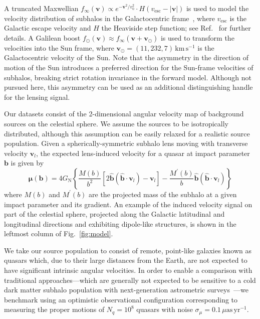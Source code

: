 \documentclass[preprint]{article}
\begin{document}
A truncated Maxwellian $f_{\infty}(\mathbf{v})\propto e^{-\mathbf{v}^{2} / v_{0}^{2}}\cdot H(v_\mathrm{esc} - |\mathbf{v}|)$ is used to model the velocity distribution of subhalos in the Galactocentric frame~\cite{1939isss.book.....C,Lisanti:2016jxe}, where $v_\mathrm{esc}$ is the Galactic escape velocity and $H$ the Heaviside step function; see Ref.~\cite{Mishra-Sharma:2020ynk} for further details. A Galilean boost $f_{\odot}(\mathbf{v}) \approx f_{\infty}\left(\mathbf{v}+\mathbf{v}_{\odot}\right)$ is used to transform the velocities into the Sun frame, where $\mathbf{v}_{\odot} = (11, 232, 7)\,\mathrm{km}\,\mathrm{s}^{-1}$ is the Galactocentric velocity of the Sun. Note that the asymmetry in the direction of motion of the Sun introduces a preferred direction for the Sun-frame velocities of subhalos, breaking strict rotation invariance in the forward model. Although not pursued here, this asymmetry can be used as an additional distinguishing handle for the lensing signal.

Our datasets consist of the 2-dimensional angular velocity map of background sources on the celestial sphere. We assume the sources to be isotropically distributed, although this assumption can be easily relaxed for a realistic source population.
Given a spherically-symmetric subhalo lens moving with transverse velocity $\mathbf{v}_{l}$, the expected lens-induced velocity for a quasar at impact parameter $\mathbf{b}$ is given by~\cite{VanTilburg:2018ykj}
\begin{equation}
    \boldsymbol{\mu}(\mathbf{b})=4 G_{\mathrm{N}}\left\{\frac{M(b)}{b^{2}}\left[2 \hat{\mathbf{b}}\left(\hat{\mathbf{b}} \cdot \mathbf{v}_{l}\right)-\mathbf{v}_{l}\right]-\frac{M^{\prime}(b)}{b} \hat{\mathbf{b}}\left(\hat{\mathbf{b}} \cdot \mathbf{v}_{l}\right)\right\}
\end{equation}
where $M(b)$ and $M^{\prime}(b)$ are the projected mass of the subhalo at a given impact parameter and its gradient. An example of the induced velocity signal on part of the celestial sphere, projected along the Galactic latitudinal and longitudinal directions and exhibiting dipole-like structures, is shown in the leftmost column of Fig.~\ref{fig:model}.

We take our source population to consist of remote, point-like galaxies known as quasars which, due to their large distances from the Earth, are not expected to have significant intrinsic angular velocities. In order to enable a comparison with traditional approaches---which are generally not expected to be sensitive to a cold dark matter subhalo population with next-generation astrometric surveys~\cite{VanTilburg:2018ykj,Mishra-Sharma:2020ynk}---we benchmark using an optimistic observational configuration corresponding to measuring the proper motions of $N_q = 10^8$ quasars with noise $\sigma_{\mu} = 0.1\,\mu\mathrm{as}\,\mathrm{yr}^{-1}$.
\end{document}
